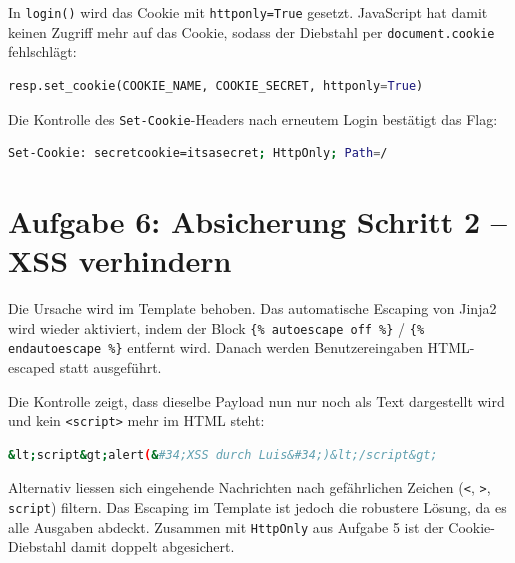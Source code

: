 \documentclass[
	fontsize=12pt,
	paper=a4,
	numbers=noenddot,
	listof=totoc,
	listof=entryprefix,
	listof=nochaptergap,
	bibliography=totoc,
	parskip=half,
	openany
]{scrbook}
\begin{document}
In \texttt{login()} wird das Cookie mit \texttt{httponly=True} gesetzt. JavaScript
hat damit keinen Zugriff mehr auf das Cookie, sodass der Diebstahl per
\texttt{document.cookie} fehlschlägt:

\begin{lstlisting}[language=Python]
resp.set_cookie(COOKIE_NAME, COOKIE_SECRET, httponly=True)
\end{lstlisting}

Die Kontrolle des \texttt{Set-Cookie}-Headers nach erneutem Login bestätigt das
Flag:

\begin{lstlisting}[language=bash]
Set-Cookie: secretcookie=itsasecret; HttpOnly; Path=/
\end{lstlisting}

\chapter*{Aufgabe 6: Absicherung Schritt 2 -- XSS verhindern}

Die Ursache wird im Template behoben. Das automatische Escaping von Jinja2 wird
wieder aktiviert, indem der Block \texttt{\{\% autoescape off \%\}} /
\texttt{\{\% endautoescape \%\}} entfernt wird. Danach werden Benutzereingaben
HTML-escaped statt ausgeführt.

Die Kontrolle zeigt, dass dieselbe Payload nun nur noch als Text dargestellt
wird und kein \texttt{<script>} mehr im HTML steht:

\begin{lstlisting}[language=bash]
&lt;script&gt;alert(&#34;XSS durch Luis&#34;)&lt;/script&gt;
\end{lstlisting}

Alternativ liessen sich eingehende Nachrichten nach gefährlichen Zeichen
(\texttt{<}, \texttt{>}, \texttt{script}) filtern. Das Escaping im Template ist
jedoch die robustere Lösung, da es alle Ausgaben abdeckt. Zusammen mit
\texttt{HttpOnly} aus Aufgabe 5 ist der Cookie-Diebstahl damit doppelt
abgesichert.
\end{document}
